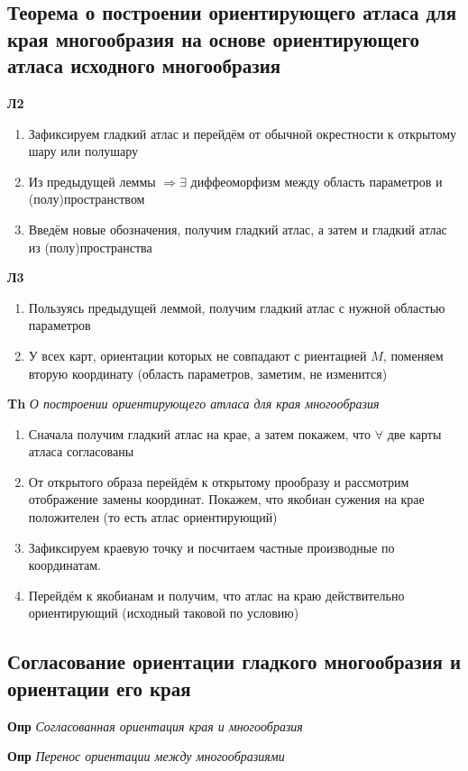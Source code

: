 \documentclass[a4paper, 14pt]{article}
\begin{document}
    \subsection{Теорема о построении ориентирующего атласа для края многообразия на основе ориентирующего атласа
    исходного многообразия}
    
    \textbf{Л2}
    
    \begin{enumerate}
        \item Зафиксируем гладкий атлас и перейдём от обычной окрестности к открытому шару или полушару
        \item Из предыдущей леммы $\Rightarrow \exists$ диффеоморфизм между область параметров и (полу)пространством
        \item Введём новые обозначения, получим гладкий атлас, а затем и гладкий атлас из (полу)пространства
    \end{enumerate}
    
    \textbf{Л3}
    
    \begin{enumerate}
        \item Пользуясь предыдущей леммой, получим гладкий атлас с нужной областью параметров
        \item У всех карт, ориентации которых не совпадают с риентацией $M$, поменяем вторую координату (область
        параметров, заметим, не изменится)
    \end{enumerate}
    
    \textbf{Th} \textit{О построении ориентирующего атласа для края многообразия}
    
    \begin{enumerate}
        \item Сначала получим гладкий атлас на крае, а затем покажем, что $\forall$ две карты атласа согласованы
        \item От открытого образа перейдём к открытому прообразу и рассмотрим отображение замены координат.
        Покажем, что якобиан сужения на крае положителен (то есть атлас ориентирующий)
        \item Зафиксируем краевую точку и посчитаем частные производные по координатам.
        \item Перейдём к якобианам и получим, что атлас на краю действительно ориентирующий (исходный таковой по условию)
    \end{enumerate}
    
    \subsection{Согласование ориентации гладкого многообразия и ориентации его края}
    
    \textbf{Опр} \textit{Согласованная ориентация края и многообразия}
    
    \textbf{Опр} \textit{Перенос ориентации между многообразиями}
\end{document}
